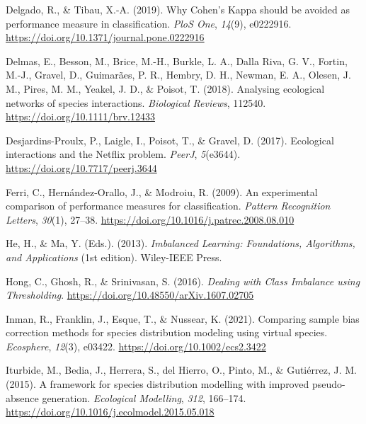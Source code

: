\documentclass[11pt]{article}
\newlength{\cslhangindent}
\newenvironment{CSLReferences}[2] %
 {%
  \setlength{\parindent}{0pt}
  \ifodd #1 \everypar{\setlength{\hangindent}{\cslhangindent}}\ignorespaces\fi
  \ifnum #2 > 0
  \setlength{\parskip}{#2\baselineskip}
  \fi
 }%
 {}
\begin{document}
\begin{CSLReferences}{1}{0}
\leavevmode{}%
Delgado, R., \& Tibau, X.-A. (2019). Why Cohen's Kappa should be avoided
as performance measure in classification. \emph{PloS One}, \emph{14}(9),
e0222916. \url{https://doi.org/10.1371/journal.pone.0222916}

\leavevmode{}%
Delmas, E., Besson, M., Brice, M.-H., Burkle, L. A., Dalla Riva, G. V.,
Fortin, M.-J., Gravel, D., Guimarães, P. R., Hembry, D. H., Newman, E.
A., Olesen, J. M., Pires, M. M., Yeakel, J. D., \& Poisot, T. (2018).
Analysing ecological networks of species interactions. \emph{Biological
Reviews}, 112540. \url{https://doi.org/10.1111/brv.12433}

\leavevmode{}%
Desjardins-Proulx, P., Laigle, I., Poisot, T., \& Gravel, D. (2017).
Ecological interactions and the Netflix problem. \emph{PeerJ},
\emph{5}(e3644). \url{https://doi.org/10.7717/peerj.3644}

\leavevmode{}%
Ferri, C., Hernández-Orallo, J., \& Modroiu, R. (2009). An experimental
comparison of performance measures for classification. \emph{Pattern
Recognition Letters}, \emph{30}(1), 27--38.
\url{https://doi.org/10.1016/j.patrec.2008.08.010}

\leavevmode{}%
He, H., \& Ma, Y. (Eds.). (2013). \emph{Imbalanced Learning:
Foundations, Algorithms, and Applications} (1st edition). Wiley-IEEE
Press.

\leavevmode{}%
Hong, C., Ghosh, R., \& Srinivasan, S. (2016). \emph{Dealing with Class
Imbalance using Thresholding}.
\url{https://doi.org/10.48550/arXiv.1607.02705}

\leavevmode{}%
Inman, R., Franklin, J., Esque, T., \& Nussear, K. (2021). Comparing
sample bias correction methods for species distribution modeling using
virtual species. \emph{Ecosphere}, \emph{12}(3), e03422.
\url{https://doi.org/10.1002/ecs2.3422}

\leavevmode{}%
Iturbide, M., Bedia, J., Herrera, S., del Hierro, O., Pinto, M., \&
Gutiérrez, J. M. (2015). A framework for species distribution modelling
with improved pseudo-absence generation. \emph{Ecological Modelling},
\emph{312}, 166--174.
\url{https://doi.org/10.1016/j.ecolmodel.2015.05.018}


\end{CSLReferences}
\end{document}
